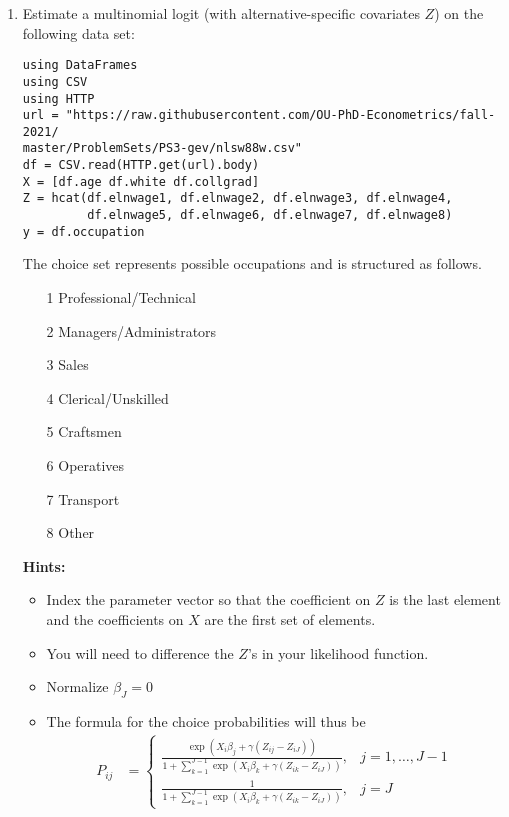 \documentclass[12pt,english]{article}
\begin{document}
\begin{enumerate}
\item Estimate a multinomial logit (with alternative-specific covariates $Z$) on the following data set:

\begin{verbatim}
using DataFrames
using CSV
using HTTP
url = "https://raw.githubusercontent.com/OU-PhD-Econometrics/fall-2021/
master/ProblemSets/PS3-gev/nlsw88w.csv"
df = CSV.read(HTTP.get(url).body)
X = [df.age df.white df.collgrad]
Z = hcat(df.elnwage1, df.elnwage2, df.elnwage3, df.elnwage4, 
         df.elnwage5, df.elnwage6, df.elnwage7, df.elnwage8)
y = df.occupation
\end{verbatim}

The choice set represents possible occupations and is structured  as follows.

\begin{enumerate}
    \item[1] Professional/Technical 
    \item[2] Managers/Administrators
    \item[3] Sales                  
    \item[4] Clerical/Unskilled     
    \item[5] Craftsmen              
    \item[6] Operatives             
    \item[7] Transport              
    \item[8] Other                  
\end{enumerate}

\textbf{Hints:} 
\begin{itemize}
    \item Index the parameter vector so that the coefficient on $Z$ is the last element and the coefficients on $X$ are the first set of elements.
    \item You will need to difference the $Z$'s in your likelihood function. 
    \item Normalize $\beta_J = 0$
    \item The formula for the choice probabilities will thus be
    \begin{align*}
        P_{ij} &= \begin{cases} \frac{\exp\left(X_{i}\beta_j + \gamma(Z_{ij}-Z_{iJ})\right)}{1+\sum_{k=1}^{J-1}\exp\left(X_{i}\beta_k + \gamma(Z_{ik}-Z_{iJ})\right)} ,& j=1,\ldots,J-1\\
         \frac{1}{1+\sum_{k=1}^{J-1}\exp\left(X_{i}\beta_k + \gamma(Z_{ik}-Z_{iJ})\right)} ,& j=J
         \end{cases}
    \end{align*}
\end{itemize}


\end{enumerate}
\end{document}
